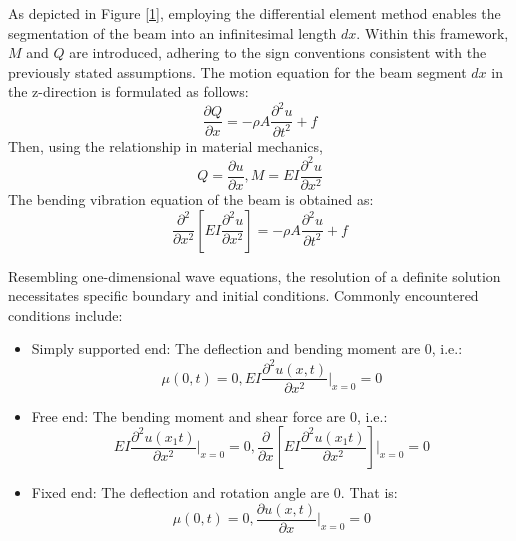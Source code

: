 \documentclass[conference]{IEEEtran}
\begin{document}
As depicted in Figure \ref{1}, employing the differential element method enables the segmentation of the beam into an infinitesimal length \(dx\). Within this framework, \(M\) and \(Q\) are introduced, adhering to the sign conventions consistent with the previously stated assumptions. The motion equation for the beam segment \(dx\) in the z-direction is formulated as follows:
\begin{equation}
\frac{\partial Q}{\partial x} = -\rho A \frac{\partial^2 u}{\partial t^2} + f
\end{equation}
Then, using the relationship in material mechanics,
\begin{equation}
Q = \frac{\partial u}{\partial x}, M = EI\frac{\partial^2 u}{\partial x^2}
\end{equation}
The bending vibration equation of the beam is obtained as:
\begin{equation}
\frac{\partial^2}{\partial x^2}\left[EI\frac{\partial^2 u}{\partial x^2}\right] = -\rho A\frac{\partial^2 u}{\partial t^2} + f
\end{equation}

Resembling one-dimensional wave equations, the resolution of a definite solution necessitates specific boundary and initial conditions. Commonly encountered conditions include:

\begin{itemize}
    \item Simply supported end: The deflection and bending moment are 0, i.e.:
    \begin{equation}
    \mu{}(0,t) = 0, EI\frac{\partial^2 u(x, t)}{\partial x^2}\bigg|_{x=0} = 0
    \end{equation}
    
    \item Free end: The bending moment and shear force are 0, i.e.:
    \begin{equation}
    EI\frac{\partial^2 u(x_1t)}{\partial x^2}\bigg|_{x=0} = 0, \frac{\partial}{\partial x}\left[EI\frac{\partial^2 u(x_1t)}{\partial x^2}\right]\bigg|_{x=0} = 0
    \end{equation}
    
    \item Fixed end: The deflection and rotation angle are 0. That is:
    \begin{equation}
    \mu{}(0,t) = 0, \frac{\partial u(x, t)}{\partial x}\bigg|_{x=0} = 0
    \end{equation}
\end{itemize}
\end{document}
